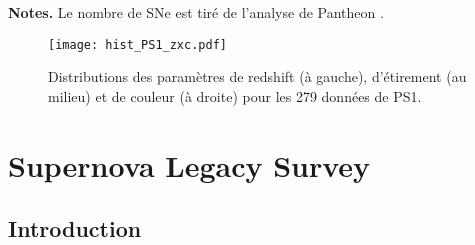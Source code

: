 \documentclass[../main/main.tex]{subfiles}
\begin{document}
\begin{table}[]
    \centering
        \caption{Critères de sélection des SNe~Ia suivies par PS1.}
        \label{tab:ps1cuts}
    \begin{threeparttable}
        \begin{tablenotes}[flushleft]
        \item\small \textbf{\hspace{-3,2pt}Notes.} Le nombre de SNe est tiré de
            l'analyse de Pantheon \citep{scolnic2018}.
        \end{tablenotes}
    \end{threeparttable}
\end{table}

\begin{figure}[ht]
    \centering
    \texttt{[image: hist\_PS1\_zxc.pdf]}
    \caption[Distributions des paramètres de redshift, étirement et couleur de
    PS1]{Distributions des paramètres de redshift (à gauche), d'étirement (au
    milieu) et de couleur (à droite) pour les 279 données de PS1.}
    \label{fig:ps1hist}
\end{figure}

\section{Supernova Legacy Survey}\label{sec:snls}
\subsection{Introduction}\label{ssec:snlsintro}
\end{document}
